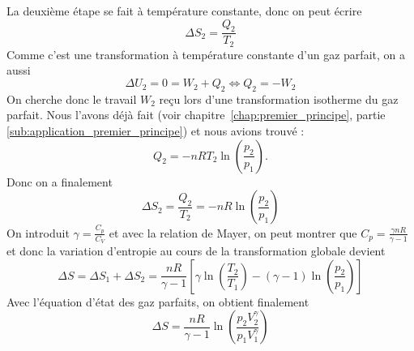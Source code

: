 \documentclass{cours}
\begin{document}
La deuxième étape se fait à température constante, donc on peut écrire 
\begin{equation}
 \Delta S_2 = \frac{Q_2}{T_2} 
\end{equation}
Comme c'est une transformation à température constante d'un gaz parfait, on a aussi 
\begin{equation}
  \Delta U_2 = 0 = W_2 + Q_2 \Leftrightarrow Q_2 = -W_2
\end{equation}
On cherche donc le travail $W_2$ reçu lors d'une transformation isotherme du gaz parfait. Nous l'avons déjà fait (voir chapitre~\ref{chap:premier_principe}, partie \ref{sub:application_premier_principe}) et nous avions trouvé :
\begin{equation}
  Q_2 = -nRT_2\ln \left( \frac{p_2}{p_1} \right) .
\end{equation}
Donc on a finalement
\begin{equation}
  \Delta S_2 = \frac{Q_2}{T_2} = -nR\ln \left( \frac{p_2}{p_1} \right) 
\end{equation}
On introduit $\gamma = \frac{C_p}{C_V}$ et avec la relation de Mayer, on peut montrer que $C_p = \frac{\gamma nR}{\gamma-1}$ et donc la variation d'entropie au cours de la transformation globale devient
\begin{equation}
  \Delta S = \Delta S_1 + \Delta S_2 = \frac{nR}{\gamma -1}\left[ \gamma\ln\left(  \frac{T_2}{T_1}\right) - (\gamma -1)\ln\left( \frac{p_2}{p_1} \right)  \right] 
\end{equation}
Avec l'équation d'état des gaz parfaits, on obtient finalement
\begin{equation}
  \Delta S = \frac{nR}{\gamma -1}\ln \left( \frac{p_2V_2^\gamma}{p_1V_1^\gamma} \right) 
\end{equation}
\end{document}
